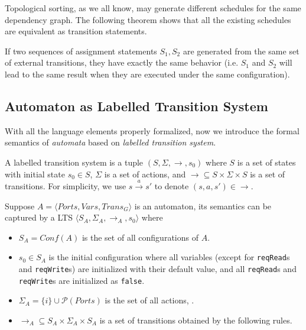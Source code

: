 Topological sorting, as we all know, may generate different schedules for the same dependency graph. The following theorem shows that all the existing schedules are equivalent as transition statements.

\begin{theorem} If two sequences of assignment statements $S_1, S_2$ are generated from the same set of external transitions, they have exactly the same behavior (i.e. $S_1$ and $S_2$ will lead to the same result when they are executed under the same configuration).
\end{theorem}

\subsection{Automaton as Labelled Transition System}
\label{subsec:lts}

With all the language elements properly formalized, now we introduce the formal semantics of \emph{automata} based on \emph{labelled transition system}.

\begin{definition}
    A labelled transition system is a tuple $(S,\Sigma,\rightarrow,s_0)$ where $S$ is a set of states with initial state $s_0\in S$, $\Sigma$ is a set of actions, and $\rightarrow\subseteq S\times\Sigma\times S$ is a set of transitions. For simplicity, we use $s\xrightarrow{a} s'$ to denote $(s,a,s')\in\rightarrow$.
\end{definition}

Suppose $A=\langle Ports, Vars, Trans_G\rangle$ is an automaton, its semantics can be captured by a LTS $\langle S_A, \Sigma_A,\rightarrow_A,s_0\rangle$ where
\begin{itemize}
    \item $S_A=Conf(A)$ is the set of all configurations of $A$.
    \item $s_0\in S_A$ is the initial configuration where all variables (except for \texttt{reqRead}s and \texttt{reqWrite}s) are initialized with their default value, and all \texttt{reqRead}s and \texttt{reqWrite}s are initialized as \texttt{false}.
    \item $\Sigma_A=\{i\}\cup \mathcal{P}(Ports)$ is the set of all actions, .
    \item $\rightarrow_A\subseteq S_A\times \Sigma_A\times S_A$ is a set of transitions obtained by the following rules.
\end{itemize}

